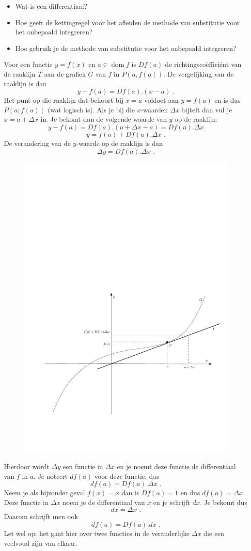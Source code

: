 \documentclass{article}
\DeclareMathOperator{\dom}{dom}
\begin{document}
\begin{itemize}
\item Wat is een differentiaal?
\item Hoe geeft de kettingregel voor het afleiden de methode van substitutie voor het onbepaald integreren?
\item Hoe gebruik je de methode van substitutie voor het onbepaald integreren?
\end{itemize}

\vspace{2mm}

Voor een functie $y=f(x)$ en $a \in \dom f$ is $Df(a)$ de richtingsco\"effici\"ent van de raaklijn $T$ aan de grafiek $G$ van $f$ in $P(a,f(a))$.
De vergelijking van de raaklijn is dan
\[
y-f(a)=Df(a).(x-a) \text { .}
\]
Het punt op die raaklijn dat behoort bij $x=a$ voldoet aan $y=f(a)$ en is dus $P(a;f(a))$ (wat logisch is).
Als je bij die $x$-waarden $\Delta x$ bijtelt dan vul je $x=a+\Delta x$ in.
Je bekomt dan de volgende waarde van $y$ op de raaklijn:
\[
y-f(a)=Df(a).(a+\Delta x -a)=Df(a).\Delta x
\]
\[
y=f(a)+Df(a).\Delta x \text { .}
\]
De verandering van de $y$-waarde op de raaklijn is dan
\[
\Delta y=Df(a).\Delta x \text { .}
\]
\begin{figure}[h]
\begin{center}
\includegraphics[height=5 cm]{substitutie1.pdf}
\end{center}
\end{figure}
Hierdoor wordt $\Delta y$ een functie in $\Delta x$ en je noemt deze functie de differentiaal van $f$ in $a$.
Je noteert  $df(a)$ voor deze functie, dus
\[
df(a)=Df(a).\Delta x \text { .}
\]
Neem je als bijzonder geval $f(x)=x$ dan is $Df(a)=1$ en dus $df(a)=\Delta x$.
Deze functie in $\Delta x$ noem je de differentiaal van $x$ en je schrijft $dx$.
Je bekomt dus
\[
dx=\Delta x \text { .}
\]
Daarom schrijft men ook
\[
df(a)=Df(a).dx \text { .}
\]
Let wel op: het gaat hier over twee functies in de veranderlijke $\Delta x$ die een veelvoud zijn van elkaar.
\end{document}
